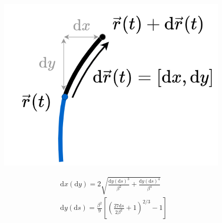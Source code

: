 \documentclass[]{pracamgr}
\begin{document}
      \begin{figure}[h]
        \centering
        \begin{minipage}{0.25\textwidth}
          \centering
          \includegraphics[width=\textwidth, trim={0 0 285 0},clip]{figs/growth.png}
        \end{minipage}
        \hspace{-40pt}
        \begin{minipage}{0.6\textwidth}
          \begin{align}
            \label{x_growth}
            & \textrm{d}x(\textrm{d}y)=2\sqrt{\frac{\textrm{d}y(\textrm{d}s)^3}{\beta^2}+\frac{\textrm{d}y(\textrm{d}s)^4}{\beta^4}}\\
            \label{y_growth}
            & \textrm{d}y(\textrm{d}s)=\frac{\beta^2}{9}\left[\left(\frac{27 \textrm{d}s}{2 \beta ^2}+1\right)^{2/3} - 1 \right]
          \end{align}
        \end{minipage}
        \vspace{0pt}
      \end{figure}
\end{document}
